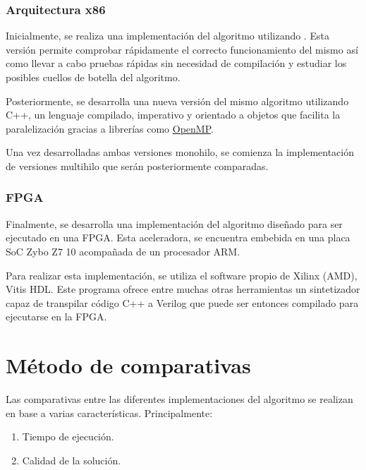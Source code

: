 \subsubsection{Arquitectura x86}

Inicialmente, se realiza una implementación del algoritmo utilizando \Python{}.
Esta versión permite comprobar rápidamente el correcto funcionamiento del mismo
así como llevar a cabo pruebas rápidas sin necesidad de compilación y
estudiar los posibles cuellos de botella del algoritmo.

Posteriormente, se desarrolla una nueva versión del mismo algoritmo
utilizando C++, un lenguaje compilado, imperativo y orientado a objetos
que facilita la paralelización gracias a librerías como 
\href{https://www.openmp.org/}{OpenMP}\@.

Una vez desarrolladas ambas versiones monohilo,
se comienza la implementación de versiones multihilo
que serán posteriormente comparadas.

\subsubsection{FPGA}

Finalmente, se desarrolla una implementación del algoritmo
diseñado para ser ejecutado en una FPGA\@.
Esta aceleradora, se encuentra embebida en una placa SoC
Zybo Z7 10 acompañada de un procesador ARM\@.

Para realizar esta implementación,
se utiliza el software propio de Xilinx (AMD),
Vitis HDL\@.
Este programa ofrece entre muchas otras herramientas
un sintetizador capaz de transpilar código C++ a Verilog
que puede ser entonces compilado
para ejecutarse en la FPGA\@.

\pagebreak
\section{Método de comparativas}

Las comparativas entre las diferentes implementaciones
del algoritmo se realizan en base a varias características.
Principalmente:

\begin{enumerate}[start=0, itemsep=0.25px]
    \item Tiempo de ejecución.
    \item Calidad de la solución.
\end{enumerate}


